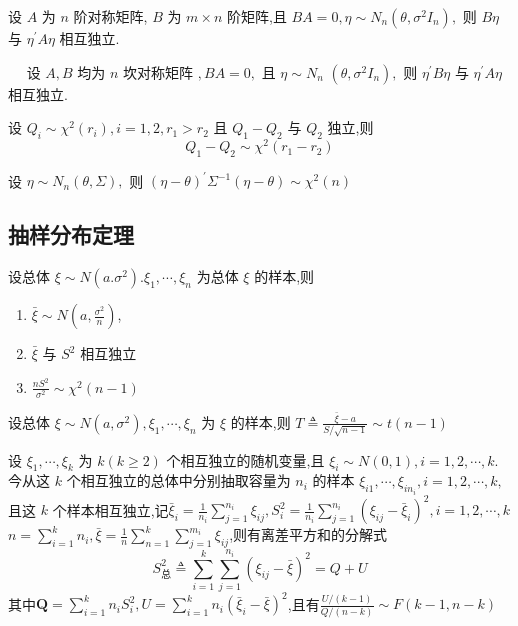 \documentclass[10pt]{yerbaformat}
\begin{document}
\begin{theorem}
    设 $A$ 为 $n$ 阶对称矩阵, $B$ 为 $m \times n$ 阶矩阵,且 $B A=0, \eta \sim N_{n}\left(\theta, \sigma^{2} I_{n}\right),$ 则 $B \eta$ 与 $\eta^{\prime} A \eta$ 相互独立.
\end{theorem}

\begin{theorem}
    $\quad$ 设 $A, B$ 均为 $n$ 坎对称矩阵 $, B A=0,$ 且 $\eta \sim N_{n}$ $\left(\theta, \sigma^{2} I_{n}\right),$ 则 $\eta^{\prime} B \eta$ 与 $\eta^{\prime} A \eta$ 相互独立.
\end{theorem}


\begin{theorem}
    设 $Q_{i} \sim \chi^{2}\left(r_{i}\right), i=1,2, r_{1}>r_{2}$ 且 $Q_{1}-Q_{2}$ 与
    $Q_{2}$ 独立,则
    $$
        Q_{1}-Q_{2} \sim \chi^{2}\left(r_{1}-r_{2}\right)
    $$
\end{theorem}

\begin{theorem}
    设 $\eta \sim N_{n}(\theta, \Sigma),$ 则 $(\eta-\theta)^{\prime} \Sigma^{-1}(\eta-\theta) \sim \chi^{2}(n)$
\end{theorem}

\subsection{抽样分布定理}
\begin{theorem}
    设总体 $\xi \sim N\left(a . \sigma^{2}\right) . \xi_{1}, \cdots, \xi_{n}$ 为总体 $\xi$ 的样本,则
    \begin{enumerate}
        \item $\bar{\xi} \sim N\left(a, \frac{\sigma^{2}}{n}\right)$,
        \item $\bar{\xi}$ 与 $S^{2}$ 相互独立
        \item $\frac{n S^{2}}{\sigma^{2}} \sim \chi^{2}(n-1)$
    \end{enumerate}
\end{theorem}

\begin{proposition}
    设总体 $\xi \sim N\left(a, \sigma^{2}\right), \xi_{1}, \cdots, \xi_{n}$ 为 $\xi$ 的样本,则
    $T \triangleq \frac{\bar{\xi}-a}{S / \sqrt{n-1}} \sim t(n-1)$
\end{proposition}

\begin{proposition}
    设 $\xi_{1}, \cdots, \xi_{k}$ 为 $k(k \geqslant 2)$ 个相互独立的随机变量,且 $\xi_{i} \sim N(0,1), i=1,2, \cdots, k .$ 今从这 $k$ 个相互独立的总体中分别抽取容量为 $n_{i}$ 的样本 $\xi_{i 1}, \cdots, \xi_{i n_{i}}, i=1,2, \cdots, k,$ 且这 $k$ 个样本相互独立,记$\bar{\xi}_{i}=\frac{1}{n_{i}} \sum_{j=1}^{n_{i}} \xi_{i j}, S_{i}^{2}=\frac{1}{n_{i}} \sum_{j=1}^{n_{i}}\left(\xi_{i j}-\bar{\xi}_{i}\right)^{2}, i=1,2, \cdots, k$
    $n=\sum_{i=1}^{k} n_{i}, \bar{\xi}=\frac{1}{n} \sum_{n=1}^{k} \sum_{j=1}^{m_{i}} \xi_{i j}$,则有离差平方和的分解式$$S_{总}^{2} \triangleq \sum_{i=1}^{k} \sum_{j=1}^{n_{i}}\left(\xi_{i j}-\bar{\xi}\right)^{2}=Q+U$$其中$\boldsymbol{Q}=\sum_{i=1}^{k} n_{i} S_{i}^{2}, U=\sum_{i=1}^{k} n_{i}\left(\bar{\xi}_{i}-\bar{\xi}\right)^{2}$,且有$\frac{U /(k-1)}{Q /(n-k)} \sim F(k-1, n-k)$
\end{proposition}
\end{document}
